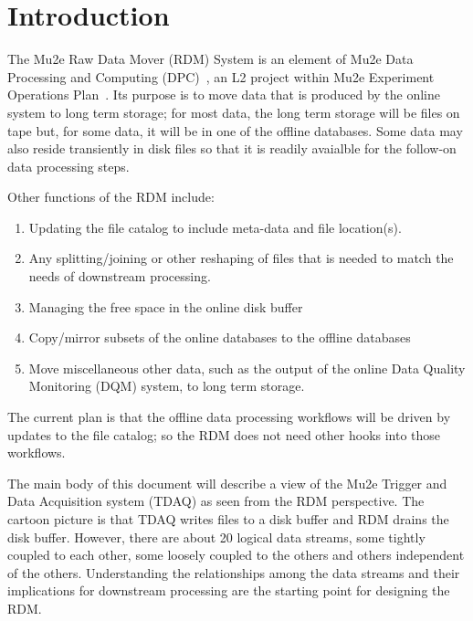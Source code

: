 \chapter{Introduction}

\label{ch:intro}

The Mu2e Raw Data Mover (RDM) System is an element of Mu2e Data Processing
and Computing (DPC)~\cite{DPC}, an L2 project within Mu2e Experiment Operations Plan~\cite{PEOP}.
Its purpose is to move data
that is produced by the online system to long term storage;
for most data, the long term storage will be files on tape
but, for some data, it will be in one of the offline databases.
Some data may also reside transiently in disk files so that
it is readily avaialble for the follow-on data processing steps.

Other functions of the RDM include:
\begin{enumerate}
\item Updating the file catalog to include meta-data and file location(s).
\item Any splitting/joining or other reshaping of files that is needed to match the needs of downstream processing.
\item Managing the free space in the online disk buffer
\item Copy/mirror subsets of the online databases to the offline databases
\item Move miscellaneous other data, such as the output of the online Data Quality Monitoring (DQM) system, to long term storage.
\end{enumerate}

The current plan is that the offline data processing workflows will be driven by updates to the file catalog;
so the RDM does not need other hooks into those workflows.



The main body of this document will describe a view of the
Mu2e Trigger and Data Acquisition system (TDAQ) as seen from the RDM perspective.
The cartoon picture is that TDAQ writes files to a disk buffer and RDM drains the disk buffer.
However, there are about 20 logical data streams, some tightly coupled to each
other, some loosely coupled to the others and others independent of the others.
Understanding the relationships among the data streams and their implications
for downstream processing are the starting point for designing the RDM.

